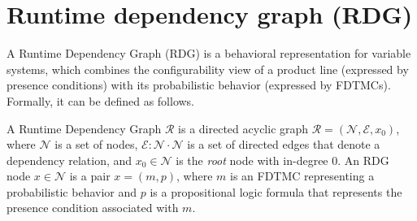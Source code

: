 





\section{Runtime dependency graph (RDG) \label{sec:runtimeDependencyGraph}}

A Runtime Dependency Graph (RDG) is a behavioral representation for variable
systems, which combines the configurability view of a product line (expressed by
presence conditions) with its probabilistic behavior (expressed by FDTMCs).
Formally, it can be defined as follows.

\begin{definition}[RDG] A Runtime Dependency Graph $\mathcal{R}$ is a directed
	acyclic graph $\mathcal{R} = (\mathcal{N}, \mathcal{E}, x_0)$, where
	$\mathcal{N}$ is a set of nodes, $\mathcal{E} : \mathcal{N} \cdot
	\mathcal{N}$ is a set of directed edges that denote a dependency
	relation, and $x_0 \in \mathcal{N}$ is the \emph{root} node with
	in-degree 0.  An RDG node $x \in \mathcal{N}$ is a pair $x = (m, p)$,
	where $m$ is an FDTMC representing a probabilistic behavior and $p$ is a
	propositional logic formula that represents the presence condition
	associated with $m$.  
\end{definition}

